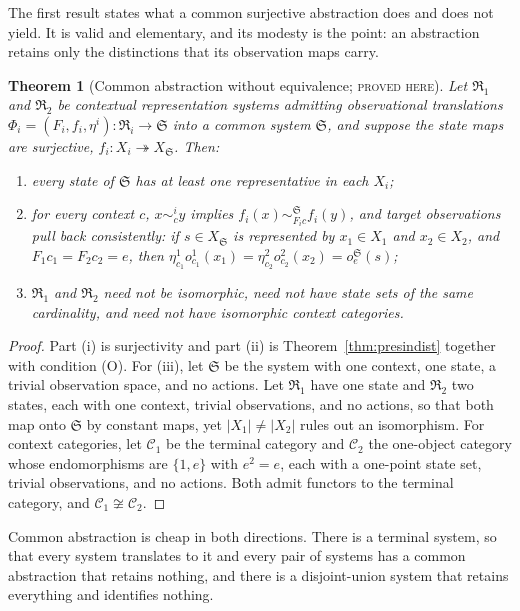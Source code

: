\documentclass[11pt]{article}
\newtheorem{theorem}{Theorem}[section]
\theoremstyle{definition}
\theoremstyle{remark}
\newcommand{\stN}{\textsc{proved here}}
\newcommand{\cC}{\mathcal C}
\newcommand{\fR}{\mathfrak R}
\newcommand{\fS}{\mathfrak S}
\newcommand{\sk}{\sim}
\begin{document}
The first result states what a common surjective abstraction does and does not yield. It is valid and elementary, and its modesty is the point: an abstraction retains only the distinctions that its observation maps carry.

\begin{theorem}[Common abstraction without equivalence; \stN]\label{thm:central}
Let $\fR_1$ and $\fR_2$ be contextual representation systems admitting observational translations $\Phi_i=(F_i,f_i,\eta^i):\fR_i\to\fS$ into a common system $\fS$, and suppose the state maps are surjective, $f_i:X_i\twoheadrightarrow X_{\fS}$. Then:
\begin{enumerate}[label=(\roman*)]
\item every state of $\fS$ has at least one representative in each $X_i$;
\item for every context $c$, $x\sk^i_cy$ implies $f_i(x)\sk^{\fS}_{F_ic}f_i(y)$, and target observations pull back consistently: if $s\in X_{\fS}$ is represented by $x_1\in X_1$ and $x_2\in X_2$, and $F_1c_1=F_2c_2=e$, then $\eta^1_{c_1}o^1_{c_1}(x_1)=\eta^2_{c_2}o^2_{c_2}(x_2)=o^{\fS}_e(s)$;
\item $\fR_1$ and $\fR_2$ need not be isomorphic, need not have state sets of the same cardinality, and need not have isomorphic context categories.
\end{enumerate}
\end{theorem}
\begin{proof}
Part (i) is surjectivity and part (ii) is Theorem~\ref{thm:presindist} together with condition (O). For (iii), let $\fS$ be the system with one context, one state, a trivial observation space, and no actions. Let $\fR_1$ have one state and $\fR_2$ two states, each with one context, trivial observations, and no actions, so that both map onto $\fS$ by constant maps, yet $|X_1|\neq|X_2|$ rules out an isomorphism. For context categories, let $\cC_1$ be the terminal category and $\cC_2$ the one-object category whose endomorphisms are $\{1,e\}$ with $e^2=e$, each with a one-point state set, trivial observations, and no actions. Both admit functors to the terminal category, and $\cC_1\not\cong\cC_2$.
\end{proof}

Common abstraction is cheap in both directions. There is a terminal system, so that every system translates to it and every pair of systems has a common abstraction that retains nothing, and there is a disjoint-union system that retains everything and identifies nothing.
\end{document}
